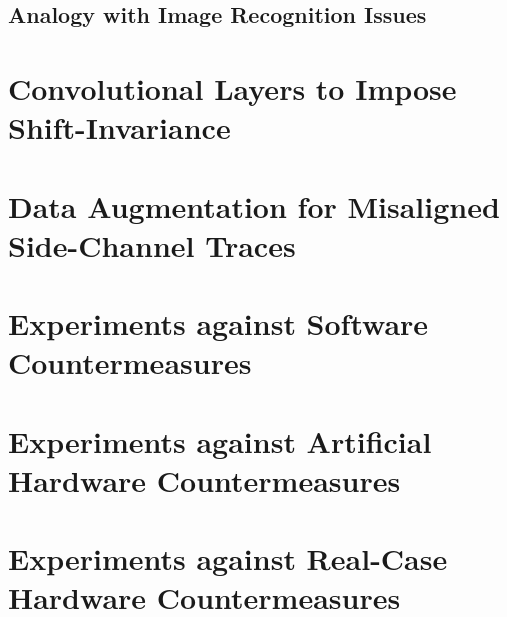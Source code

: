 \subsection{Analogy with Image Recognition Issues}


\section{Convolutional Layers to Impose Shift-Invariance}


\section{Data Augmentation for Misaligned Side-Channel Traces}

\section{Experiments against Software Countermeasures}



\section{Experiments against Artificial Hardware Countermeasures}\label{sec:hardware}%


\section{Experiments against Real-Case Hardware Countermeasures}